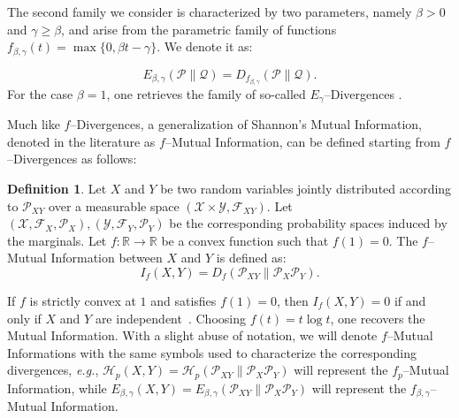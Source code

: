 \documentclass[conference]{IEEEtran}
\theoremstyle{plain}
\theoremstyle{definition}
\newtheorem{definition}{Definition}
\theoremstyle{remark}
\newcommand{\X}{\mathcal{X}}
\newcommand{\Y}{\mathcal{Y}}
\newcommand{\Pm}{\mathcal{P}}
\newcommand{\Q}{\mathcal{Q}}
\newcommand{\F}{\mathcal{F}}
\begin{document}
The second family we consider is characterized by two parameters, namely $\beta >0$ and $\gamma\geq \beta$, and arise from the parametric family of functions $f_{\beta, \gamma}(t) = \max\{0, \beta t-\gamma\}$. We denote it as:

\begin{equation}
    E_{\beta, \gamma}(\Pm\|\Q)= D_{f_{\beta, \gamma}}(\Pm\|\Q).
\end{equation}
For the case $\beta=1$, one retrieves the family of so-called $E_{\gamma}$--Divergences \cite[Eq. (47)]{sason_f_divergences}.

Much like $f$--Divergences, a generalization of Shannon's Mutual Information, denoted in the literature as 
$f$--Mutual Information, can be defined starting from $f$--Divergences as follows:
\begin{definition}\label{def:fMI}
    Let $X$ and $Y$ be two random variables jointly distributed according to $\Pm_{XY}$ over a measurable space $(\X\times\Y, \F_{XY})$. 
 Let  $(\X,\F_{X},\Pm_{X}),(\Y,\F_{Y},\Pm_Y)$ be the corresponding probability spaces induced by the marginals.  Let $f:\mathbb{R}\to \mathbb{R}$ be a convex function such that $f(1)=0$. The $f$--Mutual Information between $X$ and $Y$ is defined as:
		\begin{equation}
	I_f(X,Y)=D_f(\Pm_{XY}\|\Pm_X\Pm_Y).
	\end{equation}
\end{definition}
If $f$ is strictly convex at $1$ and satisfies $f(1)=0$, then  $I_f(X,Y)=0$ if and only if $X$ and $Y$ are independent~\cite[Theorem 5]{fDiv1}. Choosing $f(t)=t\log t$, one recovers the Mutual Information. With a slight abuse of notation, we will denote $f$--Mutual Informations with the same symbols used to characterize the corresponding divergences, \textit{e.g.}, $\mathcal{H}_p(X,Y)=\mathcal{H}_p(\Pm_{XY}\|\Pm_X\Pm_Y)$ will represent the $f_p$--Mutual Information, while $E_{\beta, \gamma}(X,Y)=E_{\beta, \gamma}(\Pm_{XY}\|\Pm_X\Pm_Y)$ will represent the $f_{\beta, \gamma}$--Mutual Information.
\end{document}
